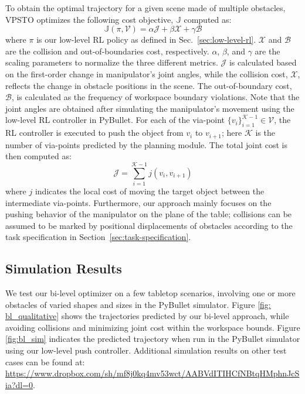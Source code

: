 To obtain the optimal trajectory for a given scene made of multiple obstacles, VPSTO optimizes the following cost objective, $\mathbb{J}$ computed as:
\begin{equation}
    \mathbb{J}(\pi, \mathcal{V}) = \alpha\mathcal{J} + \beta\mathcal{X} + \gamma\mathcal{B} 
\end{equation}
where $\pi$ is our low-level RL policy as defined in Sec.~\ref{sec:low-level-rl}. $\mathcal{X}$ and $\mathcal{B}$ are the collision and out-of-boundaries cost, respectively. $\alpha$, $\beta$, and $\gamma$ are the scaling parameters to normalize the three different metrics.  $\mathcal{J}$ is calculated based on the first-order change in manipulator's joint angles, while the collision cost, $\mathcal{X}$, reflects the change in obstacle positions in the scene. The out-of-boundary cost, $\mathcal{B}$, is calculated as the frequency of workspace boundary violations. Note that the joint angles are obtained after simulating the manipulator's movement using the low-level RL controller in PyBullet. For each of the via-point $\{v_i\}_{i=1}^{\mathcal{K}-1} \in \mathcal{V}$, the RL controller is executed to push the object from $v_i$ to $v_{i+1}$; here $\mathcal{K}$ is the number of via-points predicted by the planning module. The total joint cost is then computed as:
\begin{equation}
\label{eqn:joint-cost}
    \mathcal{J} = \sum_{i=1}^{\mathcal{K}-1} j(v_i, v_{i+1})
\end{equation}
where $j$ indicates the local cost of moving the target object between the intermediate via-points. Furthermore, our approach mainly focuses on the pushing behavior of the manipulator on the plane of the table; collisions can be assumed to be marked by positional displacements of obstacles according to the task specification in Section~\ref{sec:task-specification}.

\subsection{Simulation Results}\label{sec:bl_results}

We test our bi-level optimizer on a few tabletop scenarios, involving one or more obstacles of varied shapes and sizes in the PyBullet simulator. Figure \ref{fig: bl_qualitative} shows the trajectories predicted by our bi-level approach, while avoiding collisions and minimizing joint cost within the workspace bounds. Figure \ref{fig:bl_sim} indicates the predicted trajectory when run in the PyBullet simulator using our low-level push controller. Additional simulation results on other test cases can be found at: \url{https://www.dropbox.com/sh/mf8j0kq4mv53wct/AABVdITIHCfNBtqHMphnJcSia?dl=0}.


